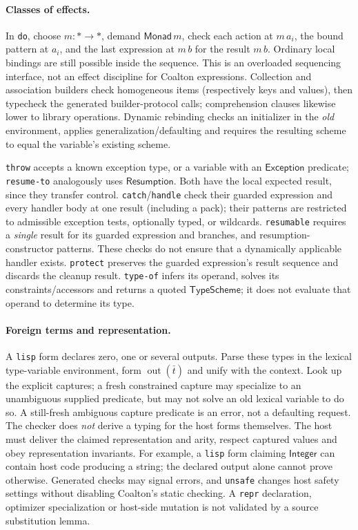 \documentclass[11pt]{article}
\theoremstyle{definition}
\newcommand{\code}[1]{\texttt{#1}}
\newcommand{\pack}{\operatorname{out}}
\newcommand{\Int}{\mathsf{Integer}}
\newcommand{\arr}{\mathbin{\to}}
\begin{document}
\paragraph{Classes of effects.}
In \code{do}, choose $m:*\arr *$, demand $\mathsf{Monad}\,m$, check each
action at $m\,a_i$, the bound pattern at $a_i$, and the last expression at
$m\,b$ for the result $m\,b$. Ordinary local bindings are still possible
inside the sequence. This is an overloaded sequencing interface, not an
effect discipline for Coalton expressions. Collection and association
builders check homogeneous items (respectively keys and values), then
typecheck the generated builder-protocol calls; comprehension clauses
likewise lower to library operations. Dynamic rebinding checks an
initializer in the \emph{old} environment, applies generalization/defaulting
and requires the resulting scheme to equal the variable's existing scheme.

\code{throw} accepts a known exception type, or a variable with an
$\mathsf{Exception}$ predicate; \code{resume-to} analogously uses
$\mathsf{Resumption}$. Both have the local expected result, since they
transfer control. \code{catch}/\code{handle} check their guarded expression
and every handler body at one result (including a pack); their patterns
are restricted to admissible exception tests, optionally typed, or
wildcards. \code{resumable} requires a \emph{single} result for its guarded
expression and branches, and resumption-constructor patterns. These
checks do not ensure that a dynamically applicable handler exists.
\code{protect} preserves the guarded expression's result sequence and
discards the cleanup result. \code{type-of} infers its operand, solves
its constraints/accessors and returns a quoted $\mathsf{TypeScheme}$;
it does not evaluate that operand to determine its type.

\paragraph{Foreign terms and representation.}
A \code{lisp} form declares zero, one or several outputs. Parse these
types in the lexical type-variable environment, form $\pack(\bar t)$ and
unify with the context. Look up the explicit captures; a fresh constrained
capture may specialize to an unambiguous supplied predicate, but may not
solve an old lexical variable to do so. A still-fresh ambiguous capture
predicate is an error, not a defaulting request. The checker does
\emph{not} derive a typing for the host forms themselves. The host must
deliver the claimed representation and arity, respect captured values and
obey representation invariants. For example, a \code{lisp} form claiming
$\Int$ can contain host code producing a string; the declared output
alone cannot prove otherwise. Generated checks may signal errors, and
\code{unsafe} changes host safety settings without disabling Coalton's
static checking. A \code{repr} declaration, optimizer specialization or
host-side mutation is not validated by a source substitution lemma.
\end{document}
